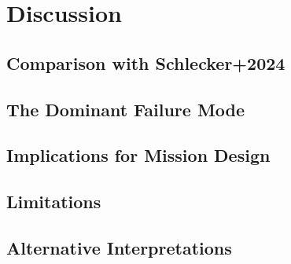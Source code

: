 \chapter{Discussion}
\label{chap:discussion}


\section{Comparison with Schlecker+2024}
\label{sec:schlecker_comparison}


\section{The Dominant Failure Mode}
\label{sec:failure_mode}


\section{Implications for Mission Design}
\label{sec:mission_design}


\section{Limitations}
\label{sec:limitations}


\section{Alternative Interpretations}
\label{sec:alternatives}

